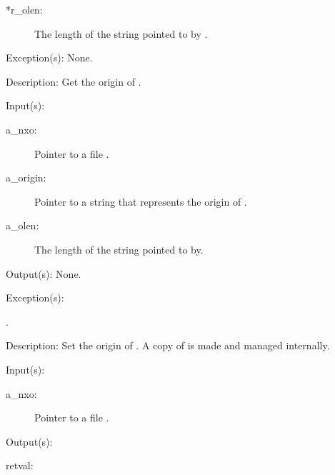 \begin{capi}
\begin{capilist}
\begin{description}
		\item[*r\_olen: ]
			The length of the string pointed to by
			.
		\end{description}
	\item[Exception(s): ] None.
	\item[Description: ]
		Get the origin of .
	\end{capilist}
\label{nxo_file_origin_set}
	\begin{capilist}
	\item[Input(s): ]
		\begin{description}\item[]
		\item[a\_nxo: ]
			Pointer to a file .
		\item[a\_origin: ]
			Pointer to a string that represents the origin of
			.
		\item[a\_olen: ]
			The length of the string pointed to by.
		\end{description}
	\item[Output(s): ] None.
	\item[Exception(s): ]
		\begin{description}\item[]
		\item[.]
		\end{description}
	\item[Description: ]
		Set the origin of .  A copy of  is
		made and managed internally.
	\end{capilist}
\label{nxo_file_fd_get}
	\begin{capilist}
	\item[Input(s): ]
		\begin{description}\item[]
		\item[a\_nxo: ]
			Pointer to a file \classname{nxo}.
		\end{description}
	\item[Output(s): ]
		\begin{description}\item[]
		\item[retval: ]

\end{description}
\end{capilist}
\end{capi}
